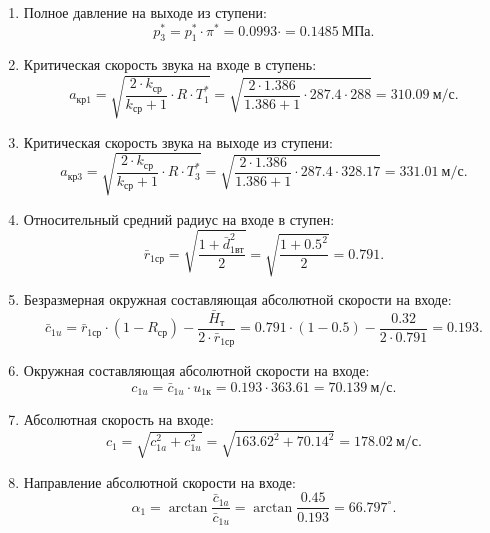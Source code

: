 \documentclass[a4paper,10pt]{article}
\begin{document}
\begin{enumerate}
        \item Полное давление на выходе из ступени:
        \[
            p_3^* = p_1^* \cdot \pi^* = 
            0.0993 \cdot  = 
            0.1485\ МПа.
        \]

        \item Критическая скорость звука на входе в ступень:
        \[
            a_{кр1} = \sqrt{ \frac{2 \cdot k_{ср} }{ k_{ср} + 1 } \cdot R \cdot T_1^* } = 
            \sqrt{ 
                \frac{ 
                        2 \cdot 1.386 
                    }{ 
                        1.386 + 1 
                } \cdot 287.4 \cdot 288
                } = 
            310.09\ м/с.
        \]

        \item Критическая скорость звука на выходе из ступени:
        \[
            a_{кр3} = \sqrt{ \frac{2 \cdot k_{ср} }{ k_{ср} + 1 } \cdot R \cdot T_3^* } = 
            \sqrt{ 
                \frac{ 
                        2 \cdot 1.386 
                    }{ 
                        1.386 + 1 
                } \cdot 287.4 \cdot 328.17
                } = 
            331.01\ м/с.
        \] 

        \item Относительный средний радиус на входе в ступен:
        \[
            \bar{r}_{1ср} = \sqrt{ \frac{ 1 + \bar{d}_{1вт}^2 }{ 2 } } = 
            \sqrt{ \frac{ 1 + 0.5 ^ 2 }{ 2 } } = 
            0.791.
        \]

        \item Безразмерная окружная составляющая абсолютной скорости на входе:
        \[
            \bar{c}_{1u} = \bar{r}_{1ср} \cdot (1 - R_{ср}) - \frac{ \bar{H}_т }{ 2 \cdot  \bar{r}_{1ср}} = 
            0.791 \cdot (1 - 0.5) -
            \frac{ 0.32 }{ 2 \cdot  0.791} =
            0.193. 
        \]

        \item Окружная составляющая абсолютной скорости на входе:
        \[
            c_{1u} = \bar{c}_{1u} \cdot u_{1к} = 
            0.193 \cdot 363.61 =
            70.139\ м/с.
        \]

        \item Абсолютная скорость на входе:
        \[
            c_1 = \sqrt{ c_{1a}^2 + c_{1u}^2 } = 
            \sqrt{ 163.62^2 + 70.14^2 } =
            178.02\ м/с.
        \]

        \item Направление абсолютной скорости на входе:
        \[
            \alpha_1 = \arctan{ \frac{ \bar{c}_{1a} }{ \bar{c}_{1u} } } =
             \arctan{ \frac{ 0.45 }{ 0.193 } } = 
             66.797 ^\circ.
        \]


\end{enumerate}
\end{document}
